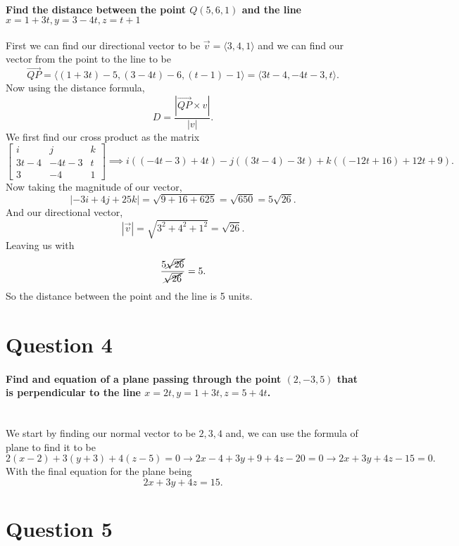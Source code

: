 \paragraph{Find the distance between the point $ Q\left( 5,6,1 \right)  $ and the line $ x=1+3t,y=3-4t,z=t+1 $}
First we can find our directional vector to be $ \vec{ v } = \langle 3,4,1 \rangle $ and we can find our vector from the point to the line to be
\[
\vec{ QP } = \langle \left( 1+3t \right) -5,\left( 3-4t \right) -6,\left( t-1 \right) -1 \rangle = \langle 3t-4,-4t-3,t \rangle
.\] 	
Now using the distance formula,
\[
	D=\frac{ \left| \vec{ QP } \times v \right| }{ \left| v \right| }
.\] 
We first find our cross product as the matrix
\[
	\begin{bmatrix} i & j & k \\ 3t-4 & -4t-3 & t \\ 3 & -4 & 1 \end{bmatrix} \implies i\left( \left( -4t-3 \right) + 4t \right) -j\left( \left( 3t-4 \right) -3t \right) + k\left( \left( -12t+16 \right) +12t+9 \right) 
.\] 
Now taking the magnitude of our vector,
\[
\left| -3i+4j+25k \right| = \sqrt{ 9+16+625 } = \sqrt{ 650 } = 5\sqrt{ 26 }
.\] 
And our directional vector,
\[
\left| \vec{ v } \right| = \sqrt{ 3^2+4^2+1^2 } = \sqrt{ 26 }
.\] 
Leaving us with 
\[
\frac{ 5 \cancel{ \sqrt{ 26 }  } }{ \cancel{ \sqrt{ 26 }  } } = 5
.\] 
So the distance between the point and the line is 5 units.

\section{Question 4}%
\label{sec: Question 4 }
\paragraph{Find and equation of a plane passing through the point $ \left( 2,-3,5 \right)  $ that is perpendicular to the line $ x=2t,y=1+3t,z=5+4t $. \\ \\}
We start by finding our normal vector to be $ 2,3,4 $ and, we can use the formula of plane to find it to be 
\[
	2\left( x - 2 \right) + 3\left( y+3 \right) + 4\left( z-5 \right) = 0 \to 2x-4+3y+9+4z-20=0 \to 2x+3y+4z-15=0
.\] 
With the final equation for the plane being 
\[
2x+3y+4z=15
.\] 


\section{Question 5}%
\label{sec: Question 5 }
